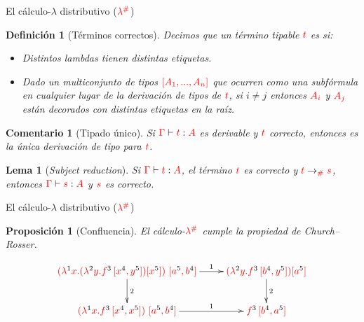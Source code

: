 \documentclass{beamer}
\newtheorem{defes}{Definición}
\newtheorem{lemes}{Lema}
\newtheorem{proes}{Proposición}
\newtheorem{comes}{Comentario}
\newcommand{\cDist}[1]{{\color{red} #1}}
\newcommand{\clambdadist}{\cDist{\lambdadist}}
\newcommand{\cLab}[1]{{\color{black} #1}}
\begin{document}
\begin{frame}{El cálculo-$\lambda$ distributivo ($\clambdadist$)}
\begin{defes}[Términos correctos]
Decimos que un término tipable $\cDist{t}$ es  si:
\begin{itemize}
\item Distintos lambdas tienen distintas etiquetas.
\item Dado un multiconjunto de tipos $\cDist{[A_1, ..., A_n]}$ que ocurren como una subfórmula
en cualquier lugar de la derivación de tipos de $\cDist{t}$, si $i\neq j$ entonces
$\cDist{A_i}$ y $\cDist{A_j}$ están decorados con distintas etiquetas en la raíz.
\end{itemize}
\end{defes}

\begin{comes}[Tipado único]
Si $\cDist{\tctx} \vdash \cDist{t} : \cDist{A}$ es derivable y $\cDist{t}$ correcto,
entonces es la única derivación de tipo para $\cDist{t}$.
\end{comes}

\begin{lemes}[\emph{Subject reduction}]
Si $\cDist{\tctx} \vdash \cDist{t} : \cDist{A}$, el término $\cDist{t}$
es correcto y $\cDist{t} \to_{\cDist{\dist}} \cDist{s}$,
entonces $\cDist{\tctx} \vdash \cDist{s} : \cDist{A}$ y $\cDist{s}$ es correcto.
\end{lemes}
\end{frame}


\begin{frame}{El cálculo-$\lambda$ distributivo ($\clambdadist$)}
\begin{proes}[Confluencia]
El cálculo-$\clambdadist$ cumple la propiedad de Church--Rosser.
\end{proes}
\[
\xymatrix{
  \cDist{(\lamp{\cLab1}{x}{(\lamp{\cLab2}{y}{f^{\cLab3}\,[x^{\cLab4}, y^{\cLab5}]}) [x^{\cLab5}]})\ [a^{\cLab5}, b^{\cLab4}]} \ar^-{2}[d] \ar^-{1}[r] & \cDist{(\lamp{\cLab2}{y}{f^{\cLab3}\,[b^{\cLab4}, y^{\cLab5}]}) [a^{\cLab5}]} \ar^-{2}[d] \\
  \cDist{(\lamp{\cLab1}{x}{f^{\cLab3}\,[x^{\cLab4}, x^{\cLab5}]})\ [a^{\cLab5}, b^{\cLab4}]} \ar^-{1}[r] & \cDist{f^{\cLab3}\,[b^{\cLab4}, a^{\cLab5}]}\\
}
\]
\end{frame}
\end{document}
